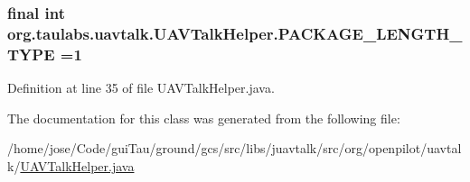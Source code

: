 \hypertarget{classorg_1_1taulabs_1_1uavtalk_1_1_u_a_v_talk_helper_a2f030393c6a563452702a5d1c0cc06fd}{
\subsubsection[{P\-A\-C\-K\-A\-G\-E\-\_\-\-L\-E\-N\-G\-T\-H\-\_\-\-T\-Y\-P\-E}]{\setlength{\rightskip}{0pt plus 5cm}final {\bf int} org.\-taulabs.\-uavtalk.\-U\-A\-V\-Talk\-Helper.\-P\-A\-C\-K\-A\-G\-E\-\_\-\-L\-E\-N\-G\-T\-H\-\_\-\-T\-Y\-P\-E =1\hspace{0.3cm}{\ttfamily [static]}}}\label{classorg_1_1taulabs_1_1uavtalk_1_1_u_a_v_talk_helper_a2f030393c6a563452702a5d1c0cc06fd}


Definition at line 35 of file U\-A\-V\-Talk\-Helper.\-java.



The documentation for this class was generated from the following file\-:\begin{DoxyCompactItemize}
\item 
/home/jose/\-Code/gui\-Tau/ground/gcs/src/libs/juavtalk/src/org/openpilot/uavtalk/\hyperlink{_u_a_v_talk_helper_8java}{U\-A\-V\-Talk\-Helper.\-java}\end{DoxyCompactItemize}
